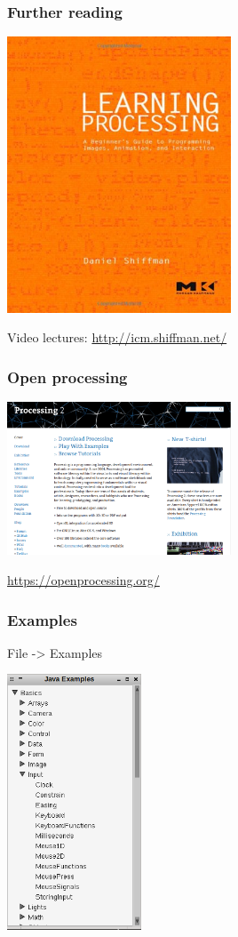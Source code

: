 \documentclass[ignorenonframetext,]{beamer}
\begin{document}
\begin{frame}[fragile]\frametitle{Further reading}

\includegraphics[width=0.5\textwidth]{../images/learningprocessing.jpg}

Video lectures: \url{http://icm.shiffman.net/}

\end{frame}

\begin{frame}\frametitle{Open processing}

\begin{center}
\includegraphics[width=0.5\textwidth]{../images/processingorg.png}

\url{https://openprocessing.org/}
\end{center}

\end{frame}

\begin{frame}\frametitle{Examples}

File -\textgreater{} Examples

\begin{center}
\includegraphics[width=0.3\textwidth]{../images/examples.png}
\end{center}

\end{frame}
\end{document}
